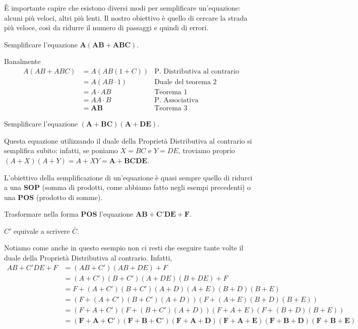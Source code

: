 \documentclass[11pt, a4paper, titlepage, oneside]{scrbook}
\begin{document}
È importante capire che esistono diversi modi per semplificare un'equazione: alcuni più veloci, altri più lenti. Il nostro obiettivo è quello di cercare la strada più veloce, così da ridurre il numero di passaggi e quindi di errori.

\Esempi \nopagebreak

Semplificare l'equazione $\bm{A(AB + ABC)}$. \nopagebreak

Banalmente
\begin{align*}
A(AB + ABC) &=  A(AB(1+C)) &\text{P. Distributiva al contrario}\\
 &= A(AB \cdot 1) &\text{Duale del teorema 2} \\
 &= A \cdot AB &\text{Teorema 1} \\
 &= AA \cdot B &\text{P. Associativa} \\
 &= \bm{AB} & \text{Teorema 3} 
\end{align*}

\Separatore

Semplificare l'equazione $\bm{(A + BC)(A + DE)}$. \nopagebreak

Questa equazione utilizzando il duale della Proprietà Distributiva al contrario si semplifica subito: infatti, se poniamo $X = BC$ e $Y = DE$, troviamo proprio $(A + X)(A + Y) = A + XY = \bm{A + BCDE}$.

\begin{Proposizione}
\label{propos-obiettivo-semplificazione}
L'obiettivo della semplificazione di un'equazione è quasi sempre quello di ridurci a una \textbf{SOP} (somma di prodotti, come abbiamo fatto negli esempi precedenti) o una \textbf{POS} (prodotto di somme).
\end{Proposizione}

\Esempi \nopagebreak

Trasformare nella forma \textbf{POS} l'equazione $\bm{AB + C'DE + F}$. \nopagebreak

\NB $C'$ equivale a scrivere $\bar{C}$.

Notiamo come anche in questo esempio non ci resti che eseguire tante volte il duale della Proprietà Distributiva al contrario. Infatti, 
\begin{align*}
AB + C'DE + F &= (AB + C')(AB + DE) + F \\
 &= (A + C')(B + C')(A + DE)(B + DE) + F \\
 &= F + (A + C')(B + C')(A + D)(A + E)(B + D)(B + E) \\
 &= (F + (A + C')(B + C')(A + D))(F + (A + E)(B + D)(B + E)) \\
 &= (F + A + C')(F + (B + C')(A + D))(F + A + E)(F + (B + D)(B + E)) \\
 &= \bm{(F + A + C')(F + B + C')(F + A + D)(F + A + E)(F + B + D)(F + B + E)}
\end{align*}
\end{document}
